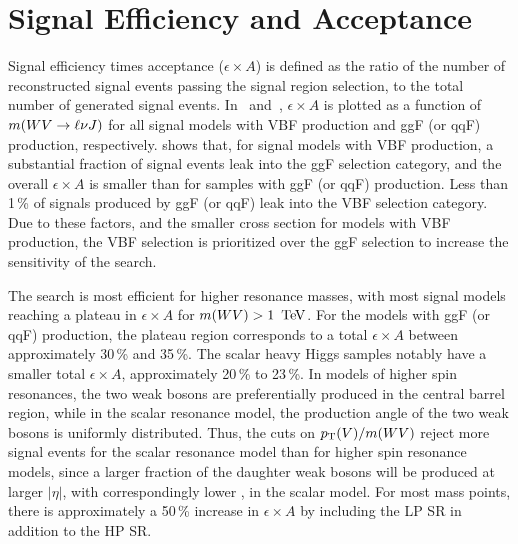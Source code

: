 %
\clearpage
\section{Signal Efficiency and Acceptance}
\label{ch:evt_sel:sig_eff}
Signal efficiency times acceptance ($\epsilon\times A$) is defined as the ratio of the number of reconstructed signal events passing the signal region selection, to the total number of generated signal events. In~\Fig{\ref{fig:sig_acc_vbf}} and~\Fig{\ref{fig:sig_acc_ggf}}, $\epsilon\times A$ is plotted as a function of $m(WV\rightarrow\ell\nu J)$ for all signal models with VBF production and ggF (or qqF) production, respectively. \Fig{\ref{fig:sig_acc_vbf}} shows that, for signal models with VBF production, a substantial fraction of signal events leak into the ggF selection category, and the overall $\epsilon\times A$ is smaller than for samples with ggF (or qqF) production. Less than 1\,\% of signals produced by ggF (or qqF) leak into the VBF selection category. Due to these factors, and the smaller cross section for models with VBF production, the VBF selection is prioritized over the ggF selection to increase the sensitivity of the search.

The search is most efficient for higher resonance masses, with most signal models reaching a plateau in $\epsilon\times A$ for $m(WV)>1\,\TeV$. For the models with ggF (or qqF) production, the plateau region corresponds to a total $\epsilon\times A$ between approximately 30\,\% and 35\,\%. The scalar heavy Higgs samples notably have a smaller total $\epsilon\times A$, approximately 20\,\% to 23\,\%. 
In models of higher spin resonances, the two weak bosons are preferentially produced in the central barrel region, while in the scalar resonance model, the production angle of the two weak bosons is uniformly distributed.
Thus, the cuts on $p_{\text{T}}(V)/m(WV)$ reject more signal events for the scalar resonance model than for higher spin resonance models, since a larger fraction of the daughter weak bosons will be produced at larger $|\eta|$, with correspondingly lower \pT, in the scalar model. For most mass points, there is approximately a 50\,\% increase in $\epsilon\times A$ by including the LP SR in addition to the HP SR.

